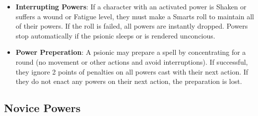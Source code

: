 \documentclass[10pt,twoside]{article}
\begin{document}
\begin{multicols}{2}
\begin{itemize}
    \item \textbf{Interrupting Powers}: If a character with an activated power is Shaken or suffers a wound or Fatigue level, they must make a Smarts roll to maintain all of their powers. If the roll is failed, all powers are instantly dropped. Powers stop automatically if the psionic sleeps or is rendered unconcious.

    \item \textbf{Power Preperation}: A psionic may prepare a spell by concentrating for a round (no movement or other actions and avoid interruptions). If successful, they ignore 2 points of penalties on all powers cast with their next action. If they do not enact any powers on their next action, the preparation is lost.

  \end{itemize}

  \end{multicols}

  \subsection{Novice Powers}
\end{document}
